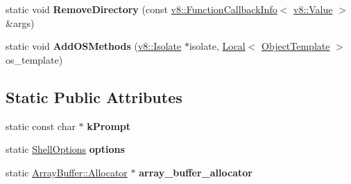 \begin{DoxyCompactItemize}
\item 
static void {\bfseries Remove\+Directory} (const \hyperlink{classv8_1_1_function_callback_info}{v8\+::\+Function\+Callback\+Info}$<$ \hyperlink{classv8_1_1_value}{v8\+::\+Value} $>$ \&args)\hypertarget{classv8_1_1_shell_aec493d82bcbc3295528d275f241cdfb6}{}\label{classv8_1_1_shell_aec493d82bcbc3295528d275f241cdfb6}

\item 
static void {\bfseries Add\+O\+S\+Methods} (\hyperlink{classv8_1_1_isolate}{v8\+::\+Isolate} $\ast$isolate, \hyperlink{classv8_1_1_local}{Local}$<$ \hyperlink{classv8_1_1_object_template}{Object\+Template} $>$ os\+\_\+template)\hypertarget{classv8_1_1_shell_a0c3ed68c0e468e6af07123281259de4c}{}\label{classv8_1_1_shell_a0c3ed68c0e468e6af07123281259de4c}

\end{DoxyCompactItemize}
\subsection*{Static Public Attributes}
\begin{DoxyCompactItemize}
\item 
static const char $\ast$ {\bfseries k\+Prompt}\hypertarget{classv8_1_1_shell_acf6e5f3411221607708dec0b3700a7c2}{}\label{classv8_1_1_shell_acf6e5f3411221607708dec0b3700a7c2}

\item 
static \hyperlink{classv8_1_1_shell_options}{Shell\+Options} {\bfseries options}\hypertarget{classv8_1_1_shell_aedbe06af26de0fe7e4618cac0ce45790}{}\label{classv8_1_1_shell_aedbe06af26de0fe7e4618cac0ce45790}

\item 
static \hyperlink{classv8_1_1_array_buffer_1_1_allocator}{Array\+Buffer\+::\+Allocator} $\ast$ {\bfseries array\+\_\+buffer\+\_\+allocator}\hypertarget{classv8_1_1_shell_ad706b940496e9cccf4807a21424c7cc3}{}\label{classv8_1_1_shell_ad706b940496e9cccf4807a21424c7cc3}

\end{DoxyCompactItemize}
